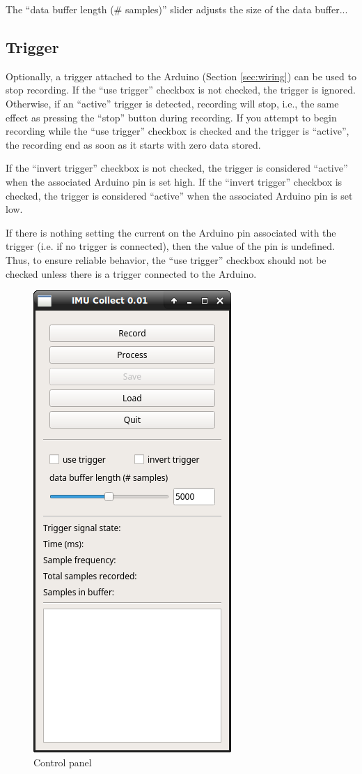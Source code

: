 \documentclass[11pt,letterpaper,article,oneside]{memoir}
\begin{document}
The ``data buffer length (\# samples)'' slider adjusts the size of the data
buffer... 


\subsection{Trigger}

Optionally, a trigger attached to the Arduino (Section \ref{sec:wiring}) can be
used to stop recording.  If the ``use trigger'' checkbox is not checked, the
trigger is ignored. Otherwise, if an ``active'' trigger is detected, recording
will stop, i.e., the same effect as pressing the ``stop'' button during
recording. If you attempt to begin recording while the ``use trigger'' checkbox
is checked and the trigger is ``active'', the recording end as soon as it starts
with zero data stored.

If the ``invert trigger'' checkbox is not checked, the trigger is considered
``active'' when the associated Arduino pin is set high. If the ``invert
trigger'' checkbox is checked, the trigger is considered ``active'' when the
associated Arduino pin is set low.

If there is nothing setting the current on the Arduino pin associated with the
trigger (i.e. if no trigger is connected), then the value of the pin is
undefined.  Thus, to ensure reliable behavior, the ``use trigger'' checkbox
should not be checked unless there is a trigger connected to the Arduino.

\begin{figure}[]
    \begin{center}
        \includegraphics[width=.45\textwidth]{screenshot_0_imu}
    \end{center}
    \caption{Control panel} 
\end{figure}
\end{document}
